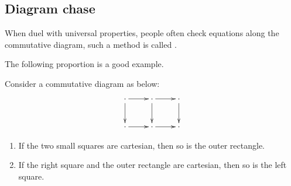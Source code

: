 \subsection{Diagram chase}
  When duel with universal properties, people often check equations along the commutative diagram, such a method is called .

  The following proportion is a good example.
  \begin{prop}[Associativity]\label{prop:assofpullback}
    Consider a commutative diagram as below:
    \begin{displaymath}
      \xymatrix{
         \cdot\ar[r]\ar[d]&\cdot\ar[r]\ar[d]&\cdot\ar[d]\\
         \cdot\ar[r]&\cdot\ar[r]&\cdot
      }
    \end{displaymath}
    \begin{enumerate}
      \item  If the two small squares are cartesian, then so is the outer rectangle.
      \item  If the right square and the outer rectangle are cartesian, then so is the left square.
    \end{enumerate}
  \end{prop}
